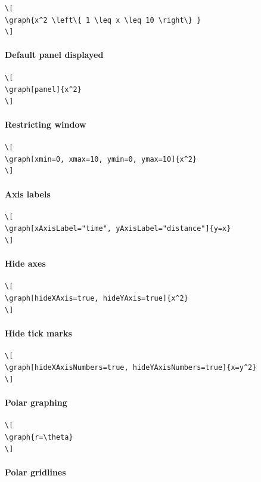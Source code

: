 \documentclass{ximera}
\begin{document}
\begin{verbatim}
\[
\graph{x^2 \left\{ 1 \leq x \leq 10 \right\} }
\]
\end{verbatim}
\paragraph{Default panel displayed}

  
\begin{verbatim}
\[
\graph[panel]{x^2}
\]
\end{verbatim}
\paragraph{Restricting window}

  
\begin{verbatim}
\[
\graph[xmin=0, xmax=10, ymin=0, ymax=10]{x^2}
\]
\end{verbatim}
\paragraph{Axis labels}

  
\begin{verbatim}
\[
\graph[xAxisLabel="time", yAxisLabel="distance"]{y=x}
\]
\end{verbatim}
\paragraph{Hide axes}

  
\begin{verbatim}
\[
\graph[hideXAxis=true, hideYAxis=true]{x^2}
\]
\end{verbatim}
\paragraph{Hide tick marks}

  
\begin{verbatim}
\[
\graph[hideXAxisNumbers=true, hideYAxisNumbers=true]{x=y^2}
\]
\end{verbatim}
\paragraph{Polar graphing}

  
\begin{verbatim}
\[
\graph{r=\theta}
\]
\end{verbatim}
\paragraph{Polar gridlines}
\end{document}
